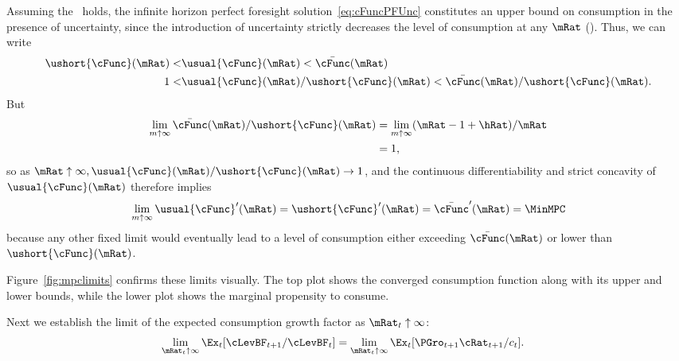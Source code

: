 \documentclass[ProjectDLO]{subfiles}
\begin{document}
Assuming the \FHWC~holds, the infinite horizon perfect foresight solution~\eqref{eq:cFuncPFUnc} constitutes an upper bound on consumption in the presence of uncertainty, since the introduction of uncertainty strictly decreases the level of consumption at any $\mRat$ (\cite{ckConcavity}).  Thus, we can write
\begin{align}
  \ushort{\cFunc}(\mRat) < & \usual{\cFunc}(\mRat)  < \bar{\cFunc}(\mRat) \label{eq:lowerltupper} \\
  1 < & \usual{\cFunc}(\mRat)/\ushort{\cFunc}(\mRat)  < \bar{\cFunc}(\mRat)/\ushort{\cFunc}(\mRat). \nonumber
\end{align}
But
\begin{align*}  \label{eq:limitlowerupper}
  \lim_{m \uparrow \infty} \bar{\cFunc}(\mRat)/\ushort{\cFunc}(\mRat)
  & = \lim_{m \uparrow \infty} (\mRat -1+ \hRat)/\mRat  \\
  & = 1,
\end{align*}
so as $\mRat \uparrow \infty, \usual{\cFunc}(\mRat)/\ushort{\cFunc}(\mRat)
\rightarrow 1$, and the continuous differentiability and strict
concavity of $\usual{\cFunc}(\mRat)$ therefore implies
\begin{equation*}  \label{eq:limxtoinftycp}
  \lim_{m \uparrow \infty} \usual{\cFunc}^{\prime}(\mRat) =
  \ushort{\cFunc}^{\prime}(\mRat) = \bar{\cFunc}^{\prime}(\mRat) = \MinMPC
\end{equation*}
because any other fixed limit would eventually lead to a level of
consumption either exceeding $\bar{\cFunc}(\mRat)$ or lower than
$\ushort{\cFunc}(\mRat)$.

Figure~\ref{fig:mpclimits} confirms these limits visually.  The top
plot shows the converged consumption function along with its upper and lower bounds,
while the lower plot shows the marginal propensity to consume.

\renewcommand{\figFile}{mpclimits}
\hypertarget{\figFile}{}


\renewcommand{\figFile}{cFuncBounds}
\hypertarget{\figFile}{}


Next we establish the limit of the expected consumption growth factor
as $\mRat_{t} \uparrow \infty$:
\begin{align*}
  \lim_{\mRat_{t} \uparrow \infty} \Ex_{t}[
  \cLevBF_{t+1}/\cLevBF_{t}]  & = \lim_{\mRat_{t} \uparrow \infty} \Ex_{t}[
                                {\PGro}_{t+1} {\cRat}_{t+1}/c_{t}].
\end{align*}
\end{document}
